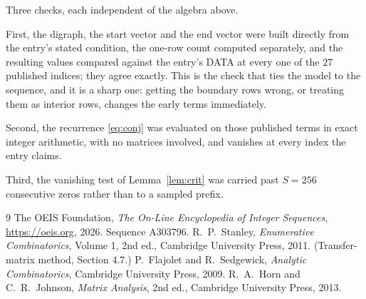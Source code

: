 \documentclass[11pt,a4paper]{article}
\theoremstyle{plain}
\theoremstyle{definition}
\begin{document}
Three checks, each independent of the algebra above.

First, the digraph, the start vector and the end vector were built directly from the
entry's stated condition, the one-row count computed separately, and the resulting values
compared against the entry's DATA at every one of the $27$ published indices; they
agree exactly. This is the check that ties the model to the sequence, and it is a sharp one:
getting the boundary rows wrong, or treating them as interior rows, changes the early terms
immediately.

Second, the recurrence \eqref{eq:conj} was evaluated on those published terms in exact
integer arithmetic, with no matrices involved, and vanishes at every index the entry claims.

Third, the vanishing test of Lemma~\ref{lem:crit} was carried past $S=256$ consecutive
zeros rather than to a sampled prefix.

\begin{thebibliography}{9}
 The OEIS Foundation, \emph{The On-Line Encyclopedia of Integer
Sequences}, \url{https://oeis.org}, 2026. Sequence A303796.
 R.~P.~Stanley, \emph{Enumerative Combinatorics}, Volume 1, 2nd ed.,
Cambridge University Press, 2011. (Transfer-matrix method, Section 4.7.)
 P.~Flajolet and R.~Sedgewick, \emph{Analytic Combinatorics}, Cambridge
University Press, 2009.
 R.~A.~Horn and C.~R.~Johnson, \emph{Matrix Analysis}, 2nd ed., Cambridge
University Press, 2013.
\end{thebibliography}
\end{document}
